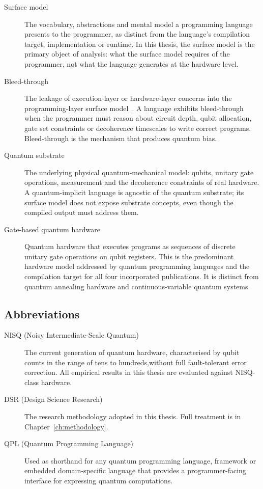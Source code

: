 \begin{description}
    \item [Surface model] The vocabulary, abstractions and mental model a programming language presents to the programmer, as distinct from the language's compilation target, implementation or runtime.
    In this thesis, the surface model is the primary object of analysis: what the surface model requires of the programmer, not what the language generates at the hardware level.

    \item [Bleed-through] The leakage of execution-layer or hardware-layer concerns into the programming-layer surface model~\cite{DiMatteo2024AbstractionHierarchy}.
    A language exhibits bleed-through when the programmer must reason about circuit depth, qubit allocation, gate set constraints or decoherence timescales to write correct programs.
    Bleed-through is the mechanism that produces quantum bias.

    \item [Quantum substrate] The underlying physical quantum-mechanical model: qubits, unitary gate operations, measurement and the decoherence constraints of real hardware.
    A quantum-implicit language is agnostic of the quantum substrate; its surface model does not expose substrate concepts, even though the compiled output must address them.

    \item [Gate-based quantum hardware] Quantum hardware that executes programs as sequences of discrete unitary gate operations on qubit registers.
    This is the predominant hardware model addressed by quantum programming languages and the compilation target for all four incorporated publications.
    It is distinct from quantum annealing hardware and continuous-variable quantum systems.
\end{description}

\subsection{Abbreviations}\label{subsec:introduction:terminology:abbreviations}

\begin{description}
    \item [NISQ (Noisy Intermediate-Scale Quantum)] The current generation of quantum hardware, characterised by qubit counts in the range of tens to hundreds,without full fault-tolerant error correction.
    All empirical results in this thesis are evaluated against NISQ-class hardware.

    \item [DSR (Design Science Research)] The research methodology adopted in this thesis.
    Full treatment is in Chapter~\ref{ch:methodology}.

    \item [QPL (Quantum Programming Language)] Used as shorthand for any quantum programming language, framework or embedded domain-specific language that provides a programmer-facing interface for expressing quantum computations.
\end{description}